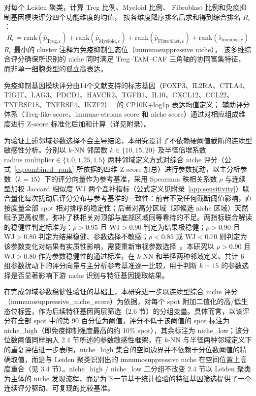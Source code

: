 \documentclass[12pt, a4paper]{ctexart}
\begin{document}
对每个 Leiden 聚类，计算 Treg 比例、Myeloid 比例、
Fibroblast 比例和免疫抑制基因模块评分四个功能维度的均值，
按各维度降序排名后求和得到综合排名 $R_c$：
\begin{equation}
R_c = \text{rank}(\bar{p}_{\text{Treg},c}) + \text{rank}(\bar{p}_{\text{Myeloid},c})
+ \text{rank}(\bar{p}_{\text{Fibroblast},c}) + \text{rank}(\bar{s}_{\text{immune},c})
\label{eq:combined_rank}
\end{equation}
$R_c$ 最小的 cluster 注释为免疫抑制生态位（immunosuppressive niche），
该多维综合评分确保所识别的 niche 同时满足 Treg--TAM--CAF 三角轴的协同富集特征，
而非单一细胞类型的孤立高表达。

免疫抑制基因模块评分由14个文献支持的标志基因（FOXP3、IL2RA、CTLA4、TIGIT、LAG3、PDCD1、HAVCR2、TGFB1、IL10、CXCL12、CCL22、TNFRSF18、TNFRSF4、IKZF2）~\citep{sakaguchi2020regulatory,sharma2023immunosuppressive}
的 CP10K+log1p 表达均值定义；
辅助评分体系（Treg-like score、immune-stroma score 和 niche score）通过对相应组成维度进行 Z-score 标准化后加和计算（详见附录）。

为验证上述邻域参数选择不会主导结论，本研究设计了不依赖硬阈值截断的连续型敏感性分析。分别以 $k$-NN 邻居数 $k \in \{10, 15, 20\}$ 及半径倍增系数 $\text{radius\_multiplier} \in \{1.0, 1.25, 1.5\}$ 两种邻域定义方式对综合 niche 评分（公式~\ref{eq:combined_rank} 所依据的四维 Z-score 加总）进行参数扰动，以主分析参数（$k=15$）下的评分向量作为参考基准，采用 Spearman 秩相关系数 $\rho$ 与连续型加权 Jaccard 相似度 WJ 两个互补指标（公式定义见附录~\ref{app:sensitivity}）联合量化每次扰动后评分分布与参考基准的一致性：前者不受任何截断阈值影响，直接度量全部 spot 相对排序的稳定性；后者对高分区域（即候选 niche 区域）天然赋予更高权重，弥补了秩相关对顶部与底部区域同等看待的不足。两指标联合解读的稳健性判定标准为：$\rho > 0.95$ 且 $\text{WJ} > 0.90$ 判定为结果极稳健；$\rho > 0.90$ 且 $\text{WJ} > 0.80$ 判定为结果稳健、参数选择不敏感；$\rho < 0.85$ 或 $\text{WJ} < 0.70$ 则判定为该参数变化对结果有实质性影响，需要重新审视参数选择~\citep{spearman1904proof}。本研究以 $\rho > 0.90$ 且 $\text{WJ} > 0.80$ 作为参数稳健性的通过标准，在 $k$-NN 和半径两种邻域定义、共计 6 组参数扰动下的评分向量与主分析参考基准逐一比较，用于判断 $k=15$ 的参数选择是否显著影响下游 niche 识别与特征基因提取结果。

在完成邻域参数稳健性验证的基础上，本研究进一步以连续型综合 niche 评分（immunosuppressive\_niche\_score）为依据，对每个 spot 附加二值化的高/低生态位标签，作为后续特征基因两层筛选（2.6 节）的分组变量。具体而言，以该评分在全部 spot 中的第 90 百分位为阈值，评分不低于该阈值的 spot 标注为 niche\_high（即免疫抑制强度最高的约 10\% spot），其余标注为 niche\_low；该分位数阈值同样纳入 2.4 节所述的参数敏感性框架，在 $k$-NN 与半径两种邻域定义下的重复评估进一步表明，niche\_high 集合的空间边界并不依赖于分位数阈值的精确取值，而是与 Leiden 聚类识别出的 immunosuppressive niche 在空间位置上高度重合（见 3.4 节）。niche\_high / niche\_low 二分组不改变 2.4 节以 Leiden 聚类为主体的 niche 发现流程，而是为下一节基于统计检验的特征基因筛选提供了一个连续评分驱动、可复现的比较基准。
\end{document}
